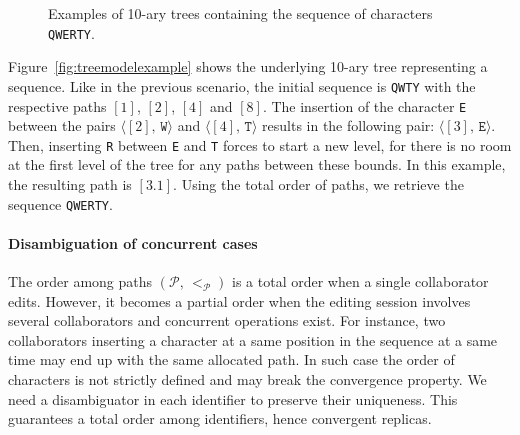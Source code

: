 \begin{figure*}
  \centering
  \hspace{20pt}
  \caption{Examples of 10-ary trees containing the sequence of characters
    \texttt{QWERTY}.}
\end{figure*}

Figure~\ref{fig:treemodelexample} shows the underlying 10-ary tree representing
a sequence. Like in the previous scenario, the initial sequence is \texttt{QWTY}
with the respective paths $[1]$, $[2]$, $[4]$ and $[8]$. The insertion of the
character \texttt{E} between the pairs $\langle [2],\, \texttt{W}\rangle$ and
$\langle [4],\, \texttt{T}\rangle$ results in the following pair:
$\langle [3],\, \texttt{E} \rangle$. Then, inserting \texttt{R} between
\texttt{E} and \texttt{T} forces to start a new level, for there is no room at
the first level of the tree for any paths between these bounds. In this example,
the resulting path is $[3.1]$. Using the total order of paths, we retrieve the
sequence \texttt{QWERTY}.



\paragraph{Disambiguation of concurrent cases}
The order among paths $(\mathcal{P},\,<_\mathcal{P})$ is a total order when a
single collaborator edits. However, it becomes a partial order when the editing
session involves several collaborators and concurrent operations exist. For
instance, two collaborators inserting a character at a same position in the
sequence at a same time may end up with the same allocated path. In such case
the order of characters is not strictly defined and may break the convergence
property. We need a disambiguator in each identifier to preserve their
uniqueness. This guarantees a total order among identifiers, hence convergent
replicas.

